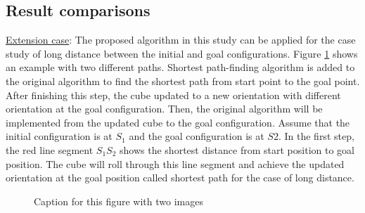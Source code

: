 \subsection{Result comparisons}
\noindent \uline{Extension case}: The proposed algorithm in this study can be applied for the case study of long distance between the initial and goal configurations. 
Figure \ref{fig:cubeLongDist} shows an example with two different paths.
Shortest path-finding algorithm is added to the original algorithm to find the shortest path from start point to the goal point. 
After finishing this step, the cube updated to a new orientation with different orientation at the goal configuration. Then, the original algorithm will be implemented from the updated cube to the goal configuration.
Assume that the initial configuration is at $S_1$ and the goal configuration is at $S2$. In the first step, the red line segment $S_1S_2$ shows the shortest distance from start position to goal position. The cube will roll through this line segment and achieve the updated orientation at the goal position called shortest path for the case of long distance.\\ 

\begin{figure}[H]
\caption{Caption for this figure with two images}
\label{fig:cubeLongDist}
\end{figure}

